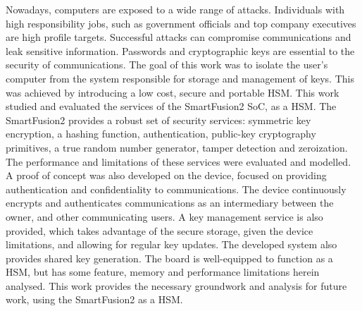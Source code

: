 \noindent Nowadays, computers are exposed to a wide range of attacks. Individuals with high responsibility jobs, such as government officials and top company executives are high profile targets. Successful attacks can compromise communications and leak sensitive information. Passwords and cryptographic keys are essential to the security of communications. The goal of this work was to isolate the user's computer from the system responsible for storage and management of keys. This was achieved by introducing a low cost, secure and portable \ac{HSM}. This work studied and evaluated the services of the SmartFusion2 \ac{SoC}, as a HSM. The SmartFusion2 provides a robust set of security services: symmetric key encryption, a hashing function, authentication, public-key cryptography primitives, a true random number generator, tamper detection and zeroization. The performance and limitations of these services were evaluated and modelled. A proof of concept was also developed on the device, focused on providing authentication and confidentiality to communications. The device continuously encrypts and authenticates communications as an intermediary between the owner, and other communicating users. A key management service is also provided, which takes advantage of the secure storage, given the device limitations, and allowing for regular key updates. The developed system also provides shared key generation. The board is well-equipped to function as a HSM, but has some feature, memory and performance limitations herein analysed. This work provides the necessary groundwork and analysis for future work, using the SmartFusion2 as a HSM.
